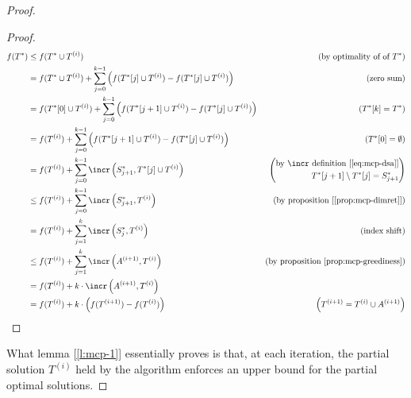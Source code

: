 \begin{proof}
    \begin{proof}
        \begin{align*}
                  f(T^*)
            &\leq f(T^* \cup T^{(i)}) & \text{(by optimality of of $T^*$)}&\\
            &=    f(T^* \cup T^{(i)}) + \sum_{j = 0}^{k - 1} \left( f(T^*[j] \cup T^{(i)}) - f(T^*[j] \cup T^{(i)}) \right)         & \text{(zero sum)} \\
            &=    f(T^*[0] \cup T^{(i)}) + \sum_{j = 0}^{k - 1} \left( f(T^*[j + 1] \cup T^{(i)}) - f(T^*[j] \cup T^{(i)}) \right)  & (T^*[k] = T^*) \\
            &=    f(T^{(i)}) + \sum_{j = 0}^{k - 1} \left( f(T^*[j + 1] \cup T^{(i)}) - f(T^*[j] \cup T^{(i)}) \right)              & (T^*[0] = \emptyset) \\
            &=    f(T^{(i)}) + \sum_{j = 0}^{k - 1} \incr \left( S^*_{j + 1}, T^*[j] \cup T^{(i)} \right)                           & \left( \begin{aligned} \text{by $\incr$ definition [\ref{eq:mcp-dsa}]} \\ T^*[j + 1] \setminus T^*[j] = S^*_{j + 1} \end{aligned} \right) \\
            &\leq f(T^{(i)}) + \sum_{j = 0}^{k - 1} \incr \left( S^*_{j + 1}, T^{(i)} \right)                                       & \text{(by proposition [\ref{prop:mcp-dimret}])} \\
            &=    f(T^{(i)}) + \sum_{j = 1}^k \incr \left( S^*_j, T^{(i)} \right)                                                   & \text{(index shift)} \\
            &\leq f(T^{(i)}) + \sum_{j = 1}^k \incr \left( A^{(i + 1)}, T^{(i)} \right)                                             & \text{(by proposition \ref{prop:mcp-greediness})} \\
            &=    f(T^{(i)}) + k \cdot \incr \left( A^{(i + 1)}, T^{(i)} \right)                                                    & \\
            &=    f(T^{(i)}) + k \cdot \left( f(T^{(i + 1)}) - f(T^{(i)}) \right)                                                   & \left( T^{(i + 1)} = T^{(i)} \cup A^{(i + 1)} \right)
        \end{align*}
    \end{proof}

    What lemma [\ref{l:mcp-1}] essentially proves is that, at each iteration, the partial solution $T^{(i)}$ held by the algorithm enforces an upper bound for the partial optimal solutions.
    

\end{proof}

